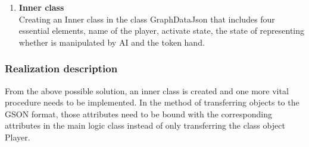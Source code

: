 \begin{enumerate}
	\item\textbf{Inner class}\\
Creating an Inner class in the class GraphDataJson that includes four essential elements, name of the player, activate state, the state of representing whether is manipulated by AI and the token hand.

\end{enumerate}

\subsubsection{Realization description}

From the above possible solution, an inner class is created and one more vital procedure needs to be implemented.
In the method of transferring objects to the GSON format, those attributes need to be bound with the corresponding attributes in the main logic class instead of only transferring the class object Player.

